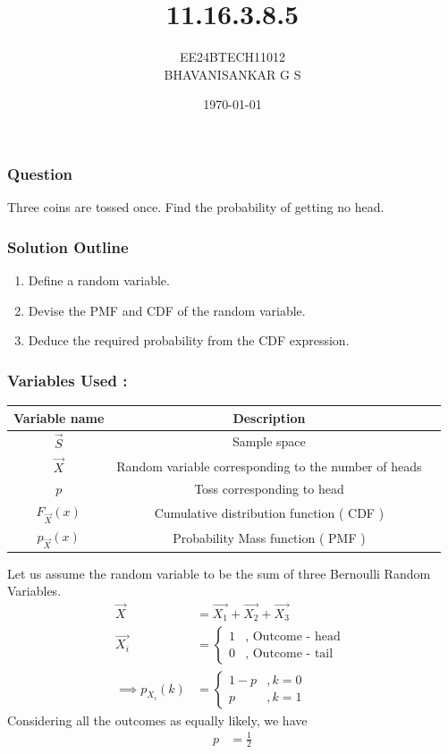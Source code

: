 \documentclass{beamer}
\begin{document}
\title{11.16.3.8.5}
\author{EE24BTECH11012 \\ BHAVANISANKAR G S }
\date{\today}
\frame{\titlepage}

\begin{frame}
\frametitle{Question}
Three coins are tossed once. Find the probability of getting no head.\\
\end{frame}

\begin{frame}
\frametitle{Solution Outline}
\begin{enumerate}
	\item Define a random variable.
	\item Devise the PMF and CDF of the random variable.
	\item Deduce the required probability from the CDF expression.
\end{enumerate}
\end{frame}

\begin{frame}
\frametitle{Variables Used : }
\begin{center}
\begin{tabular}{|c|c|c|}
\hline 
\textbf{Variable name} & \textbf{Description} \\
\hline 
$\vec{S}$ & Sample space \\
\hline 
$\vec{X}$ & Random variable corresponding to the number of heads \\
\hline
$p$ & Toss corresponding to head \\
\hline
$F_{\vec{X}} (x)$ & Cumulative distribution function ( CDF ) \\
\hline
$p_{\vec{X}} (x)$ & Probability Mass function ( PMF ) \\
\hline
\end{tabular}
\end{center}
\end{frame}

\begin{frame}
	Let us assume the random variable to be the sum of three Bernoulli Random Variables.
\begin{align}
	\vec{X} &= \vec{X_{1}} + \vec{X_{2}} + \vec{X_{3}} \\
	\vec{X_{i}} &= 
	\begin{cases}
		1 & , \text{ Outcome - head } \\
		0 & , \text{ Outcome - tail }
	\end{cases} \\
	\implies p_{X_{i}} (k) &= 
	\begin{cases}
		1 - p & , k = 0 \\
		p & , k = 1
	\end{cases}
\end{align}
Considering all the outcomes as equally likely, we have
\begin{align}
	p &= \frac{1}{2} \label{eq:p}
\end{align}
\end{frame}
\end{document}
